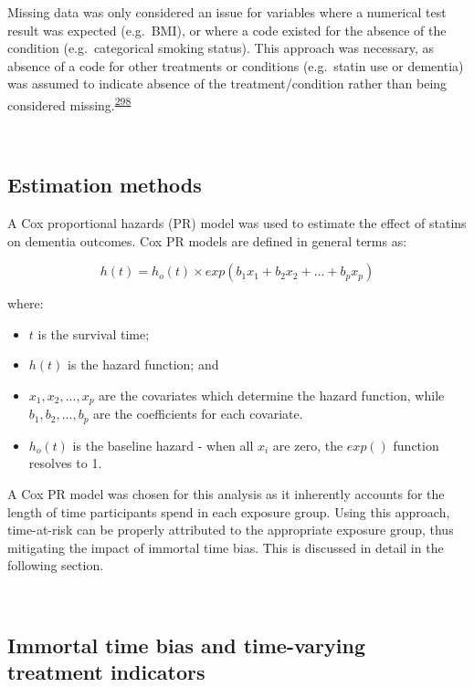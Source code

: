 \documentclass[a4paper, twoside]{templates/ociamthesis}
\providecommand{\tightlist}{%
  \setlength{\itemsep}{0pt}\setlength{\parskip}{0pt}}
\begin{document}
Missing data was only considered an issue for variables where a numerical test result was expected (e.g.~BMI), or where a code existed for the absence of the condition (e.g.~categorical smoking status). This approach was necessary, as absence of a code for other treatments or conditions (e.g.~statin use or dementia) was assumed to indicate absence of the treatment/condition rather than being considered missing.\textsuperscript{\protect\hyperlink{ref-wells2013strategies}{298}}

~

\hypertarget{estimation-methods}{%
\subsection{Estimation methods}\label{estimation-methods}}

A Cox proportional hazards (PR) model was used to estimate the effect of statins on dementia outcomes. Cox PR models are defined in general terms as:

\begin{equation}
  h(t) = h_o(t) \times exp(b_1x_1 + b_2x_2 + ... +b_px_p)
  \label{eq:cox-model}
\end{equation}

where:

\begin{itemize}
\tightlist
\item
  \(t\) is the survival time;
\item
  \(h(t)\) is the hazard function; and
\item
  \(x_1,x_2,...,x_p\) are the covariates which determine the hazard function, while \(b_1,b_2,...,b_p\) are the coefficients for each covariate.
\item
  \(h_o(t)\) is the baseline hazard - when all \(x_i\) are zero, the \(exp()\) function resolves to 1.
\end{itemize}

A Cox PR model was chosen for this analysis as it inherently accounts for the length of time participants spend in each exposure group. Using this approach, time-at-risk can be properly attributed to the appropriate exposure group, thus mitigating the impact of immortal time bias. This is discussed in detail in the following section.

~

\hypertarget{cprd-immortal-time-bias}{%
\subsection{Immortal time bias and time-varying treatment indicators}\label{cprd-immortal-time-bias}}
\end{document}
